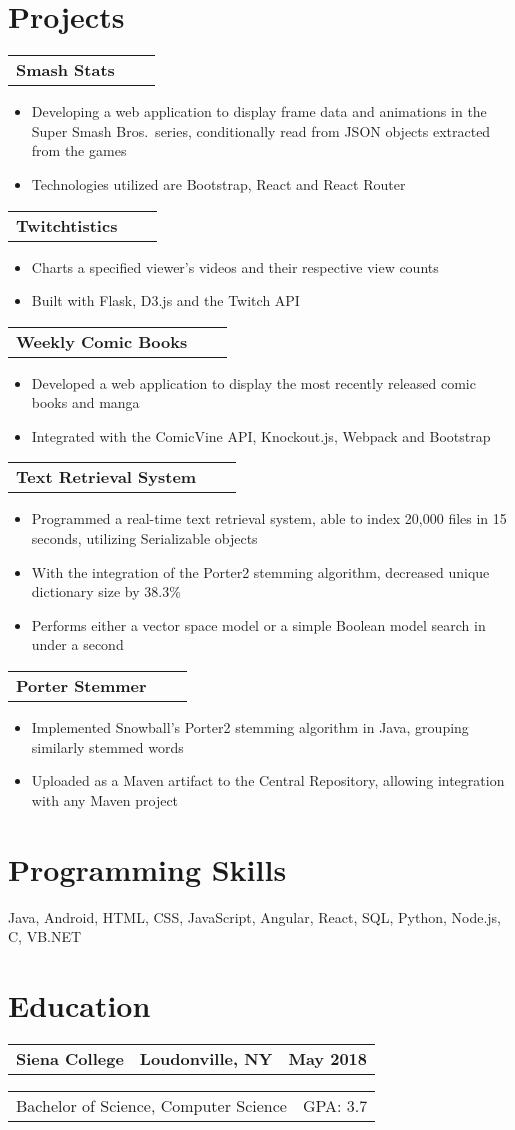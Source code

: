 \documentclass[letterpaper,11pt]{article}
\makeatletter
\newcommand{\resumeItem}[1]{
  \item\small{#1}
  \vspace{-2pt}
}
\newcommand{\resumeSubheading}[3]{
  \begin{tabular*}{\textwidth}{l@{\extracolsep{\fill}}c@{\extracolsep{\fill}}r}
    \textbf{#1} & \textbf{#2} & \textbf{#3}
  \end{tabular*}
  \vspace{-17pt}
}
\newcommand{\resumeSubSubheading}[2]{
    \begin{tabular*}{\textwidth}{l@{\extracolsep{\fill}}r}
      #1 & #2 \\
    \end{tabular*}
  }
\newcommand{\resumeItemListStart}{\begin{itemize}}
\newcommand{\resumeItemListEnd}{\end{itemize}\vspace{-5pt}}
\makeatother
\begin{document}
\section{Projects}
  \resumeSubheading{Smash Stats}{}{}
    \resumeItemListStart
      \resumeItem{Developing a web application to display frame data and animations in the Super Smash Bros.\ series, conditionally read from JSON objects extracted from the games}
      \resumeItem{Technologies utilized are Bootstrap, React and React Router}
    \resumeItemListEnd

  \resumeSubheading{Twitchtistics}{}{}
    \resumeItemListStart
      \resumeItem{Charts a specified viewer's videos and their respective view counts}
      \resumeItem{Built with Flask, D3.js and the Twitch API}
    \resumeItemListEnd
  
  \resumeSubheading{Weekly Comic Books}{}{}
    \resumeItemListStart
      \resumeItem{Developed a web application to display the most recently released comic books and manga}
      \resumeItem{Integrated with the ComicVine API, Knockout.js, Webpack and Bootstrap}
    \resumeItemListEnd

  \resumeSubheading{Text Retrieval System}{}{}
    \resumeItemListStart
      \resumeItem{Programmed a real-time text retrieval system, able to index 20,000 files in 15 seconds, utilizing Serializable objects}
      \resumeItem{With the integration of the Porter2 stemming algorithm, decreased unique dictionary size by 38.3\%}
      \resumeItem{Performs either a vector space model or a simple Boolean model search in under a second}
    \resumeItemListEnd

  \resumeSubheading{Porter Stemmer}{}{}
    \resumeItemListStart
      \resumeItem{Implemented Snowball's Porter2 stemming algorithm in Java, grouping similarly stemmed words}
      \resumeItem{Uploaded as a Maven artifact to the Central Repository, allowing integration with any Maven project}
    \resumeItemListEnd


\section{Programming Skills}
  \small{Java, Android, HTML, CSS, JavaScript, Angular, React, SQL, Python, Node.js, C, VB.NET}

\section{Education}
  \resumeSubheading{Siena College}{Loudonville, NY}{May 2018}
    \resumeSubSubheading{Bachelor of Science, Computer Science}{GPA: 3.7}

\end{document}
